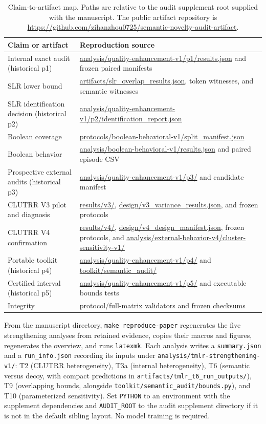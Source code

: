 \begin{table}[H]
\caption{Claim-to-artifact map.  Paths are relative to the audit supplement
root supplied with the manuscript.  The public artifact repository is
\url{https://github.com/zihanzhou0725/semantic-novelty-audit-artifact}.}
\label{tab:repro-map}
\centering
\small
\begin{tabular}{L{1.3in}L{4.4in}}
\toprule
Claim or artifact & Reproduction source \\
\midrule
Internal exact audit (historical p1) &
\url{analysis/quality-enhancement-v1/p1/results.json} and frozen paired manifests \\
SLR lower bound &
\url{artifacts/slr_overlap_results.json}, token witnesses, and semantic witnesses \\
SLR identification decision (historical p2) &
\url{analysis/quality-enhancement-v1/p2/identification_report.json} \\
Boolean coverage &
\url{protocols/boolean-behavioral-v1/split_manifest.json} \\
Boolean behavior &
\url{analysis/boolean-behavioral-v1/results.json} and paired episode CSV \\
Prospective external audits (historical p3) &
\url{analysis/quality-enhancement-v1/p3/} and candidate manifest \\
CLUTRR V3 pilot and diagnosis &
\url{results/v3/}, \url{design/v3_variance_results.json}, and frozen protocols \\
CLUTRR V4 confirmation &
\url{results/v4/}, \url{design/v4_design_manifest.json}, frozen protocols, and
\url{analysis/external-behavior-v4/cluster-sensitivity-v1/} \\
Portable toolkit (historical p4) &
\url{analysis/quality-enhancement-v1/p4/} and \url{toolkit/semantic_audit/} \\
Certified interval (historical p5) &
\url{analysis/quality-enhancement-v1/p5/} and executable bounds tests \\
Integrity &
protocol/full-matrix validators and frozen checksums \\
\bottomrule
\end{tabular}
\end{table}

From the manuscript directory, \texttt{make reproduce-paper}
regenerates the five strengthening analyses from retained evidence, copies
their macros and figures, regenerates the overview, and runs \texttt{latexmk}.
Each analysis writes a \texttt{summary.json} and a \texttt{run\_info.json}
recording its inputs under \texttt{analysis/tmlr-strengthening-v1/}: T2
(CLUTRR heterogeneity), T3a (internal heterogeneity), T6 (semantic versus
decoy, with compact predictions in \texttt{artifacts/tmlr\_t6\_run\_outputs/}),
T9 (overlapping bounds, alongside \texttt{toolkit/semantic\_audit/bounds.py}),
and T10 (parameterized sensitivity).  Set \texttt{PYTHON} to an environment
with the supplement dependencies and \texttt{AUDIT\_ROOT} to the audit
supplement directory if it is not in the default sibling layout.  No model
training is required.
